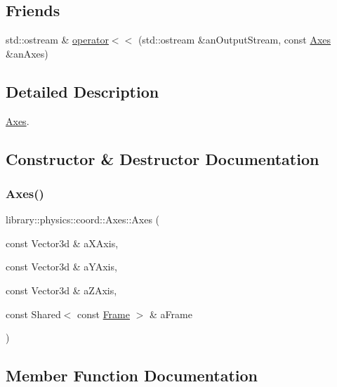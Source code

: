 \subsection*{Friends}
\begin{DoxyCompactItemize}
\item 
std\+::ostream \& \hyperlink{classlibrary_1_1physics_1_1coord_1_1_axes_a0ed7e604ae11f069877a8ee1a2d9b051}{operator$<$$<$} (std\+::ostream \&an\+Output\+Stream, const \hyperlink{classlibrary_1_1physics_1_1coord_1_1_axes}{Axes} \&an\+Axes)
\end{DoxyCompactItemize}


\subsection{Detailed Description}
\hyperlink{classlibrary_1_1physics_1_1coord_1_1_axes}{Axes}. 

\subsection{Constructor \& Destructor Documentation}
\mbox{\label{classlibrary_1_1physics_1_1coord_1_1_axes_ac4db55f930e0038c8d1e3223d3911952}} 
\subsubsection{\texorpdfstring{Axes()}{Axes()}}
{\footnotesize\ttfamily library\+::physics\+::coord\+::\+Axes\+::\+Axes (\begin{DoxyParamCaption}\item[{const Vector3d \&}]{a\+X\+Axis,  }\item[{const Vector3d \&}]{a\+Y\+Axis,  }\item[{const Vector3d \&}]{a\+Z\+Axis,  }\item[{const Shared$<$ const \hyperlink{classlibrary_1_1physics_1_1coord_1_1_frame}{Frame} $>$ \&}]{a\+Frame }\end{DoxyParamCaption})}



\subsection{Member Function Documentation}
\mbox{\label{classlibrary_1_1physics_1_1coord_1_1_axes_a5f03439d03d6f22449bdea28e22bb074}} 
